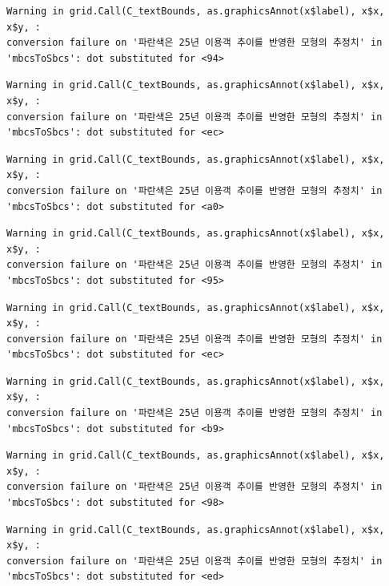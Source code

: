 \documentclass[
  letterpaper,
  DIV=11,
  numbers=noendperiod]{scrreprt}
\begin{document}
\begin{verbatim}
Warning in grid.Call(C_textBounds, as.graphicsAnnot(x$label), x$x, x$y, :
conversion failure on '파란색은 25년 이용객 추이를 반영한 모형의 추정치' in
'mbcsToSbcs': dot substituted for <94>
\end{verbatim}

\begin{verbatim}
Warning in grid.Call(C_textBounds, as.graphicsAnnot(x$label), x$x, x$y, :
conversion failure on '파란색은 25년 이용객 추이를 반영한 모형의 추정치' in
'mbcsToSbcs': dot substituted for <ec>
\end{verbatim}

\begin{verbatim}
Warning in grid.Call(C_textBounds, as.graphicsAnnot(x$label), x$x, x$y, :
conversion failure on '파란색은 25년 이용객 추이를 반영한 모형의 추정치' in
'mbcsToSbcs': dot substituted for <a0>
\end{verbatim}

\begin{verbatim}
Warning in grid.Call(C_textBounds, as.graphicsAnnot(x$label), x$x, x$y, :
conversion failure on '파란색은 25년 이용객 추이를 반영한 모형의 추정치' in
'mbcsToSbcs': dot substituted for <95>
\end{verbatim}

\begin{verbatim}
Warning in grid.Call(C_textBounds, as.graphicsAnnot(x$label), x$x, x$y, :
conversion failure on '파란색은 25년 이용객 추이를 반영한 모형의 추정치' in
'mbcsToSbcs': dot substituted for <ec>
\end{verbatim}

\begin{verbatim}
Warning in grid.Call(C_textBounds, as.graphicsAnnot(x$label), x$x, x$y, :
conversion failure on '파란색은 25년 이용객 추이를 반영한 모형의 추정치' in
'mbcsToSbcs': dot substituted for <b9>
\end{verbatim}

\begin{verbatim}
Warning in grid.Call(C_textBounds, as.graphicsAnnot(x$label), x$x, x$y, :
conversion failure on '파란색은 25년 이용객 추이를 반영한 모형의 추정치' in
'mbcsToSbcs': dot substituted for <98>
\end{verbatim}

\begin{verbatim}
Warning in grid.Call(C_textBounds, as.graphicsAnnot(x$label), x$x, x$y, :
conversion failure on '파란색은 25년 이용객 추이를 반영한 모형의 추정치' in
'mbcsToSbcs': dot substituted for <ed>
\end{verbatim}
\end{document}
